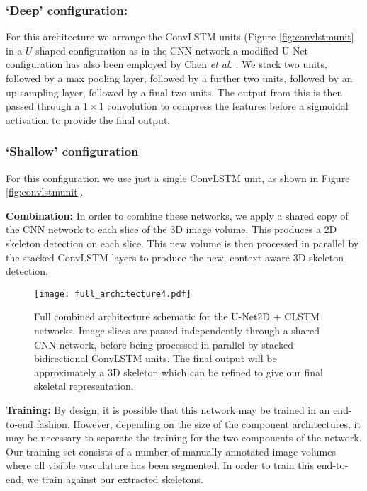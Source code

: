\documentclass[journal,transmag]{IEEEtran}
\begin{document}
\subsubsection{`Deep' configuration:}
\label{sec:deep_clstm}
For this architecture we arrange the ConvLSTM units (Figure \ref{fig:convlstmunit} in a $U$-shaped configuration as in the CNN network a modified U-Net configuration has also been employed by Chen \emph{et al.} \cite{Chen2016}. We stack two units, followed by a max pooling layer, followed by a further two units, followed by an up-sampling layer, followed by a final two units. The output from this is then passed through a $1\times1$ convolution to compress the features before a sigmoidal activation to provide the final output.
\subsubsection{`Shallow' configuration}
\label{sec:shallow_clstm}
For this configuration we use just a single ConvLSTM unit, as shown in Figure \ref{fig:convlstmunit}. 

\textbf{Combination: } In order to combine these networks, we apply a shared copy of the CNN network to each slice of the 3D image volume. This produces a 2D skeleton detection on each slice. This new volume is then processed in parallel by the stacked ConvLSTM layers to produce the new, context aware 3D skeleton detection. 

\begin{figure*}
\centering
\texttt{[image: full\_architecture4.pdf]}
\caption{Full combined architecture schematic for the U-Net2D + CLSTM networks. Image slices are passed independently through a shared CNN network, before being processed in parallel by stacked bidirectional ConvLSTM units. The final output will be approximately a 3D skeleton which can be refined to give our final skeletal representation. }
\label{fig:full_architecture}
\end{figure*}

\textbf{Training: } By design, it is possible that this network may be trained in an end-to-end fashion. However, depending on the size of the component architectures, it may be necessary to  separate the training for the two components of the network. Our training set consists of a number of manually annotated image volumes where all visible vasculature has been segmented. In order to train this end-to-end, we train against our extracted skeletons. 
\end{document}
